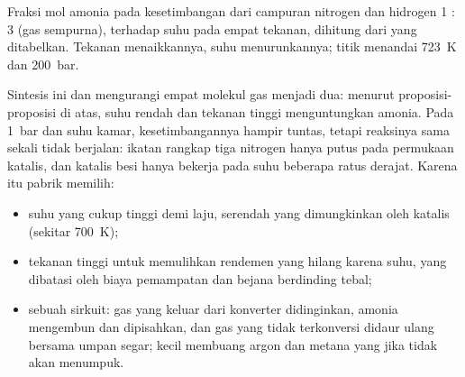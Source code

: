 \begin{omfigure}

{\small Fraksi mol amonia pada kesetimbangan dari campuran nitrogen dan
hidrogen 1 : 3 (gas sempurna), terhadap suhu pada empat tekanan, dihitung
dari  yang ditabelkan. Tekanan menaikkannya, suhu
menurunkannya; titik menandai \qty{723}{K} dan \qty{200}{bar}.}
\end{omfigure}

Sintesis ini  dan mengurangi empat molekul gas menjadi dua:
menurut proposisi-proposisi di atas, suhu rendah dan tekanan tinggi
menguntungkan amonia. Pada \qty{1}{bar} dan suhu kamar, kesetimbangannya
hampir tuntas, tetapi reaksinya sama sekali tidak berjalan: ikatan rangkap
tiga nitrogen hanya putus pada permukaan katalis, dan katalis besi hanya
bekerja pada suhu beberapa ratus derajat. Karena itu pabrik memilih:
\begin{itemize}
  \item suhu yang cukup tinggi demi laju, serendah yang dimungkinkan oleh
        katalis (sekitar \qty{700}{K});
  \item tekanan tinggi untuk memulihkan rendemen yang hilang karena suhu,
        yang dibatasi oleh biaya pemampatan dan bejana berdinding tebal;
  \item sebuah sirkuit: gas yang keluar dari konverter didinginkan, amonia
        mengembun dan dipisahkan, dan gas yang tidak terkonversi didaur
        ulang bersama umpan segar;  kecil membuang argon dan metana
        yang jika tidak akan menumpuk.
\end{itemize}

